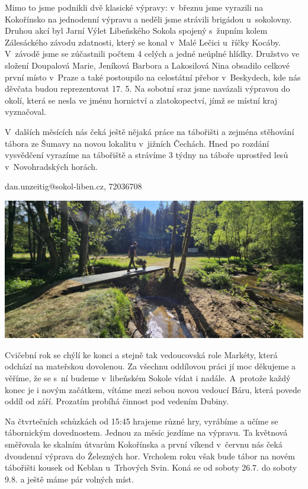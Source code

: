 \documentclass[11pt]{article}
\begin{document}
Mimo to jsme podnikli dvě klasické výpravy: v~březnu jsme vyrazili na
Kokořínsko na jednodenní výpravu a neděli jsme strávili brigádou
u~sokolovny. Druhou akcí byl Jarní Výlet Libeňského Sokola spojený
s~župním kolem Zálesáckého závodu zdatnosti, který se konal v~Malé
Lečici u~říčky Kocáby. V~závodě jsme se zúčastnili počtem 4 celých a
jedné neúplné hlídky. Družstvo ve složení Doupalová Marie, Jeníková
Barbora a Lakosilová Nina obsadilo celkové první místo v~Praze a také
postoupilo na celostátní přebor v~Beskydech, kde nás děvčata budou
reprezentovat 17. 5. Na sobotní sraz jsme navázali výpravou do okolí,
která se nesla ve jménu hornictví a zlatokopectví, jímž se místní kraj
vyznačoval.

V~dalších měsících nás čeká ještě nějaká práce na tábořišti a zejména
stěhování tábora ze Šumavy na novou lokalitu v~jižních Čechách. Hned po
rozdání vysvědčení vyrazíme na tábořiště a strávíme 3 týdny na táboře
uprostřed lesů v~Novohradských horách.

\signature{Dan Unzeitig (Kondor)}{dan.unzeitig@sokol-liben.cz, 72036708}

\vspace*{12pt}

\noindent
\includegraphics[width=\textwidth]{tabor-lavka.jpg}


Cvičební rok se chýlí ke konci a stejně tak vedoucovská role Markéty,
která odchází na mateřskou dovolenou. Za všechnu oddílovou práci jí moc
děkujeme a věříme, že se s~ní budeme v~libeňském Sokole vídat i nadále.
A~protože každý konec je i novým začátkem, vítáme mezi sebou novou
vedoucí Báru, která povede oddíl od září. Prozatím probíhá činnost pod
vedením Dubiny.

Na čtvrtečních schůzkách od 15:45 hrajeme různé hry, vyrábíme a učíme
se tábornickým dovednostem. Jednou za měsíc jezdíme na výpravu. Ta
květnová směřovala ke skalním útvarům Kokořínska a první víkend v~červnu
nás čeká dvoudenní výprava do Železných hor. Vrcholem roku však bude
tábor na novém tábořišti kousek od Keblan u~Trhových Svin. Koná se od
soboty 26.7. do soboty 9.8. a ještě máme pár volných míst.
\end{document}
